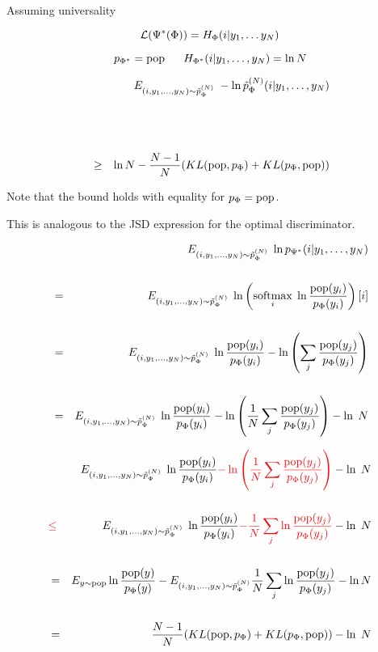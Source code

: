 {\vfill
Assuming universality

\vfill
$${\cal L}(\Psi^*(\Phi)) = H_\Phi(i|y_1,\ldots y_{N})$$

\vfill
$$p_{\Phi^*} = \mathrm{pop}\;\;\;\;\;\;H_{\Phi^*}(i|y_1,\ldots,y_N) = \ln N$$



\begin{eqnarray*}
  && E_{(i,y_1,\dots,y_{N}) \sim \tilde{p}_\Phi^{(N)}}\;- \ln \tilde{p}^{(N)}_\Phi(i|y_1,\ldots,y_{N}) \\
  \\
  \\
  \\
  & \geq & \ln N - \frac{N-1}{N}(KL(\mathrm{pop},p_\Phi) + KL(p_\Phi,\mathrm{pop}))
\end{eqnarray*}

\vfill
Note that the bound holds with equality for $p_\Phi = \mathrm{pop}$.

\vfill
This is analogous to the JSD expression for the optimal discriminator.

{\huge
 \begin{eqnarray*}
    & & E_{(i,y_1,\ldots,y_{N}) \sim \tilde{p}_\Phi^{(N)}}\;\ln p_{\Psi^*}(i|y_1,\ldots,y_{N}) \\
    \\
    & = & E_{(i,y_1,\ldots,y_{N}) \sim \tilde{p}_\Phi^{(N)}}\;\ln \left(\operatorname*{softmax}_i \;\ln \frac{\mathrm{pop}(y_i)}{p_\Phi(y_i)}\right)[i] \\
    \\
    & = & E_{(i,y_1,\ldots,y_{N}) \sim \tilde{p}_\Phi^{(N)}}\;\ln\frac{\mathrm{pop}(y_i)}{p_\Phi(y_i)} - \ln\left(\sum_j \frac{\mathrm{pop}(y_j)}{p_\Phi(y_j)} \right) \\
    \\
    & = & E_{(i,y_1,\ldots,y_{N}) \sim \tilde{p}_\Phi^{(N)}}\;\ln\frac{\mathrm{pop}(y_i)}{p_\Phi(y_i)} - \ln\left(\frac{1}{N}\sum_j \frac{\mathrm{pop}(y_j)}{p_\Phi(y_j)} \right) - \ln\;N
  \end{eqnarray*}
}

{\huge
 \begin{eqnarray*}
    & & E_{(i,y_1,\ldots,y_{N}) \sim \tilde{p}_\Phi^{(N)}}\;\ln\frac{\mathrm{pop}(y_i)}{p_\Phi(y_i)} {\color{red} - \ln\left(\frac{1}{N}\sum_j \frac{\mathrm{pop}(y_j)}{p_\Phi(y_j)} \right)} - \ln\;N \\
    \\
    & {\color{red} \leq} & E_{(i,y_1,\ldots,y_{N}) \sim \tilde{p}_\Phi^{(N)}}\;\ln\frac{\mathrm{pop}(y_i)}{p_\Phi(y_i)} {\color{red} - \frac{1}{N} \sum_j \ln\frac{\mathrm{pop}(y_j)}{p_\Phi(y_j)}} - \ln\;N \\
    \\
    & = & E_{y \sim \mathrm{pop}} \ln \frac{\mathrm{pop}(y)}{p_\Phi(y)} -  E_{(i,y_1,\ldots,y_N) \sim \tilde{p}^{(N)}_\Phi} \frac{1}{N} \sum_j \ln\frac{\mathrm{pop}(y_j)}{p_\Phi(y_j)} - \ln N \\
    \\
    & = & \frac{N-1}{N}(KL(\mathrm{pop},p_\Phi) + KL(p_\Phi,\mathrm{pop})) - \ln\;N \\
  \end{eqnarray*}
}


}

